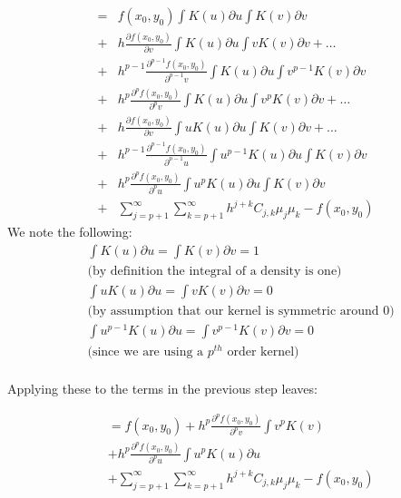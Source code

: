 \documentclass[11pt]{article}
\theoremstyle{definition}
\begin{document}
\begin{equation*}
\begin{split}
=&f(x_{0},y_{0})\int K(u)\partial{u}\int K(v)\partial{v} \\
+& h\frac{\partial f(x_{0},y_{0})}{\partial{v}}\int K(u)\partial{u}\int vK(v)\partial{v} + \hdots \\  
+ & h^{p-1} \frac{\partial^{p-1} f(x_{0},y_{0})}{\partial^{p-1} v} \int K(u)\partial{u}\int v^{p-1}K(v)\partial{v}\\
+ & h^{p} \frac{\partial^{p} f(x_{0},y_{0})}{\partial^{p} v} \int K(u)\partial{u}\int v^{p}K(v)\partial{v} + \hdots \\
+ & h\frac{\partial f(x_{0},y_{0})}{\partial{v}}\int uK(u)\partial{u}\int K(v)\partial{v} + \hdots \\
+ & h^{p-1} \frac{\partial^{p-1} f(x_{0},y_{0})}{\partial^{p-1} u} \int u^{p-1}K(u)\partial{u}\int K(v)\partial{v}\\
+ & h^{p} \frac{\partial^{p} f(x_{0},y_{0})}{\partial^{p} u} \int u^{p}K(u)\partial{u}\int K(v)\partial{v}   \\
+ &\sum_{j=p+1}^{\infty} \sum_{k=p+1}^{\infty} h^{j+k}C_{j,k}\mu_{j}\mu_{k} -f\left(x_0, y_0\right)
\end{split}
\end{equation*}
We note the following:
\begin{equation*}
\begin{split}
& \int K(u)\partial{u}=\int K(v)\partial{v} =1 \\
& \text{(by definition the integral of a density is one)} \\
& \int uK(u)\partial{u}=\int vK(v)\partial{v} =0 \\
& \text{(by assumption that our kernel is symmetric around 0)} \\
& \int u^{p-1}K(u)\partial{u} = \int v^{p-1}K(v)\partial{v} = 0 \\
& \text{(since we are using a $p^{th}$ order kernel)} \\
\end{split}
\end{equation*}

\noindent
Applying these to the terms in the previous step leaves:

\begin{equation*}
\begin{split}
 &= f(x_{0},y_{0}) + h^{p} \frac{\partial^{p} f(x_{0},y_{0})}{\partial^{p} v} \int v^{p}K(v) \\
 &+ h^{p} \frac{\partial^{p} f(x_{0},y_{0})}{\partial^{p} u} \int u^{p}K(u)\partial{u} \\
 &+ \sum_{j=p+1}^{\infty} \sum_{k=p+1}^{\infty} h^{j+k}C_{j,k}\mu_{j}\mu_{k} -f\left(x_0, y_0\right) \\
\end{split}
\end{equation*}
\end{document}
